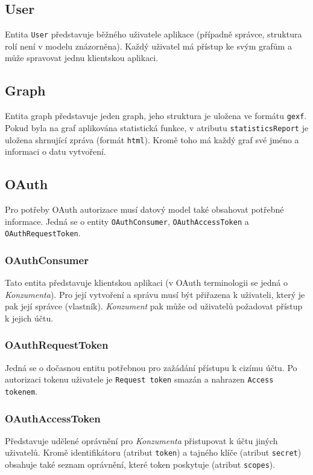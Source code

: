 \documentclass[thesis=M,czech]{FITthesis}[2014/05/6]
\begin{document}
\subsection{User}
Entita \texttt{User} představuje běžného uživatele aplikace (případně správce, struktura rolí není v modelu znázorněna). Každý
uživatel má přístup ke svým grafům a může spravovat jednu klientskou aplikaci.

\subsection{Graph}
Entita graph představuje jeden graph, jeho struktura je uložena ve formátu \texttt{gexf}. Pokud byla na graf aplikována statistická funkce,
v atributu \texttt{statistics\-Report} je uložena shrnující zpráva (formát \texttt{html}). Kromě toho má každý graf své jméno a informaci 
o datu vytvoření.

\subsection{OAuth}
Pro potřeby OAuth autorizace musí datový model také obsahovat potřebné informace. Jedná se o entity \texttt{OAuth\-Consumer}, \texttt{OAuth\-Access\-Token} a \texttt{OAuth\-Request\-Token}.

\subsubsection{OAuthConsumer}
Tato entita představuje klientskou aplikaci (v OAuth terminologii se jedná o \textit{Konzumenta}). Pro její vytvoření a správu musí být přiřazena k uživateli, který je pak její správce (vlastník).
\textit{Konzument} pak může od uživatelů požadovat přístup k jejich účtu.

\subsubsection{OAuthRequestToken}
Jedná se o dočasnou entitu potřebnou pro zažádání přístupu k cizímu účtu. Po autorizaci tokenu uživatele je \texttt{Request token} smazán a nahrazen \texttt{Access tokenem}.

\subsubsection{OAuthAccessToken}
Představuje udělené oprávnění pro \textit{Konzumenta} přistupovat k účtu jiných uživatelů. Kromě identifikátoru (atribut \texttt{token}) a tajného klíče (atribut \texttt{secret}) obsahuje také seznam
oprávnění, které token poskytuje (atribut \texttt{scopes}).
\end{document}
